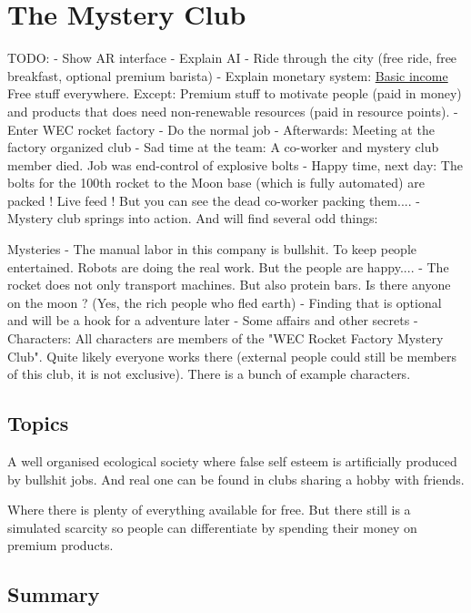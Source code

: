 \chapter{The Mystery Club}
\label{ch:mystery club}

TODO:
- Show AR interface
- Explain AI
- Ride through the city (free ride, free breakfast, optional premium barista)
- Explain monetary system: \hyperref[sec:basic incomes]{Basic income} Free stuff everywhere. Except: Premium stuff to motivate people (paid in money) and products that does need non-renewable resources (paid in resource points).
- Enter WEC rocket factory
- Do the normal job
- Afterwards: Meeting at the factory organized club
- Sad time at the team: A co-worker and mystery club member died. Job was end-control of explosive bolts
- Happy time, next day: The bolts for the 100th rocket to the Moon base (which is fully automated) are packed ! Live feed ! But you can see the dead co-worker packing them....
- Mystery club springs into action. And will find several odd things:

Mysteries
- The manual labor in this company is bullshit. To keep people entertained. Robots are doing the real work. But the people are happy....
- The rocket does not only transport machines. But also protein bars. Is there anyone on the moon ? (Yes, the rich people who fled earth) - Finding that is optional and will be a hook for a adventure later
- Some affairs and other secrets
- Characters: All characters are members of the "WEC Rocket Factory Mystery Club". Quite likely everyone works there (external people could still be members of this club, it is not exclusive). There is a bunch of example characters.

\section{Topics}

A well organised ecological society where false self esteem is artificially produced by bullshit jobs. And real one can be found in clubs sharing a hobby with friends.

Where there is plenty of everything available for free. But there still is a simulated scarcity so people can differentiate by spending their money on premium products.



\section{Summary}

